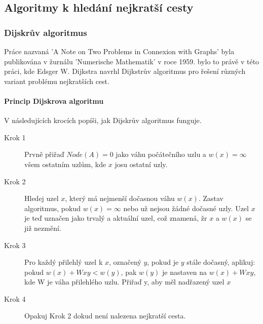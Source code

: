 \documentclass[thesis=M,czech]{FITthesis}[2019/12/23]
\theoremstyle{plain}
\theoremstyle{definition}
\begin{document}



\subsection{Algoritmy k hledání nejkratší cesty}


\subsubsection{Dijskrův algoritmus}

Práce nazvaná 'A Note on Two Problems in Connexion with Graphs' byla publikována v žurnálu 'Numerische Mathematik' v roce 1959. bylo to právě v této práci, kde Edsger W. Dijkstra navrhl Dijkstrův algoritmus pro řešení  různých variant problému nejkratších cest.

\paragraph{Princip Dijskrova algoritmu}

V následujících krocích popíši, jak Dijskrův algoritmus funguje.
\begin{description}
\item [Krok 1]
Prvně přiřaď $Node(A) = 0$ jako váhu počátečního uzlu a $w(x) = \infty$ všem ostatním uzlům, kde $x$ josu ostatní uzly.
\item[Krok 2]
Hledej uzel $x$, který má nejmenší dočasnou váhu $w(x)$. Zastav algoritmus, pokud $w(x) = \infty$ nebo už nejsou žádné dočasné uzly. Uzel $x$ je teď uznačen jako trvalý a aktuální uzel, což znamená, žr $x$ a $w(x)$ se již nezmění.   
\item[Krok 3]
Pro každý přilehlý uzel k $x$, označený $y$, pokud je $y$ stále dočasný, aplikuj: 
pokud $w(x) + Wxy < w(y)$, pak $w(y)$ je nastaven na $w(x) + Wxy$, kde W je váha přilehlého uzlu. Přiřaď y, aby měl nadřazený uzel $x$
\item[Krok 4]
Opakuj Krok 2 dokud není nalezena nejkratší cesta. 
\end{description}
\end{document}
